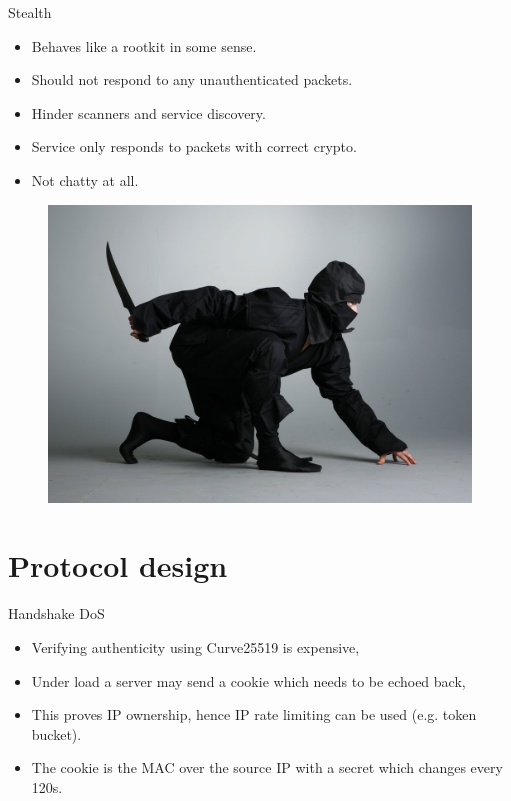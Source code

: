 \documentclass{beamer}
\begin{document}
    \begin{frame}{Stealth}
        \begin{minipage}{0.6\textwidth}
            \begin{itemize}
                \item Behaves like a rootkit in some sense.
                \item Should not respond to any unauthenticated packets.
                \item Hinder scanners and service discovery.
                \item Service only responds to packets with correct crypto.
                \item Not chatty at all. 
            \end{itemize} 
        \end{minipage}
        \begin{minipage}{0.37\textwidth}
            \begin{figure}
                \includegraphics[width=\textwidth]{ninja.jpg}
            \end{figure}
        \end{minipage}
    \end{frame}

    \section{Protocol design}

    \begin{frame}{Handshake DoS}
    \begin{itemize}
        \item Verifying authenticity using Curve25519 is expensive,
        \item Under load a server may send a cookie which needs to be echoed back,
        \item This proves IP ownership, hence IP rate limiting can be used (e.g. token bucket).
        \item The cookie is the MAC over the source IP with a secret which changes every 120s.
    \end{itemize}
    \end{frame}
\end{document}
